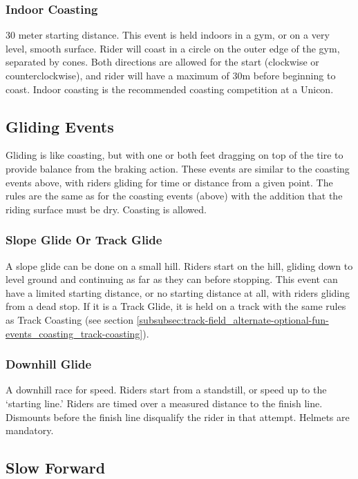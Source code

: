 \subsubsection{Indoor Coasting}
30 meter starting distance.
This event is held indoors in a gym, or on a very level, smooth surface.
Rider will coast in a circle on the outer edge of the gym, separated by cones.
Both directions are allowed for the start (clockwise or counterclockwise), and rider will have a maximum of 30m before beginning to coast.
Indoor coasting is the recommended coasting competition at a Unicon.

\subsection{Gliding Events}

Gliding is like coasting, but with one or both feet dragging on top of the tire to provide balance from the braking action.
These events are similar to the coasting events above, with riders gliding for time or distance from a given point.
The rules are the same as for the coasting events (above) with the addition that the riding surface must be dry.
Coasting is allowed.

\subsubsection{Slope Glide Or Track Glide}
A slope glide can be done on a small hill.
Riders start on the hill, gliding down to level ground and continuing as far as they can before stopping.
This event can have a limited starting distance, or no starting distance at all, with riders gliding from a dead stop.
If it is a Track Glide, it is held on a track with the same rules as Track Coasting (see section \ref{subsubsec:track-field_alternate-optional-fun-events_coasting_track-coasting}).

\subsubsection{Downhill Glide}
A downhill race for speed.
Riders start from a standstill, or speed up to the `starting line.'
Riders are timed over a measured distance to the finish line.
Dismounts before the finish line disqualify the rider in that attempt.
Helmets are mandatory.

\subsection{Slow Forward}

